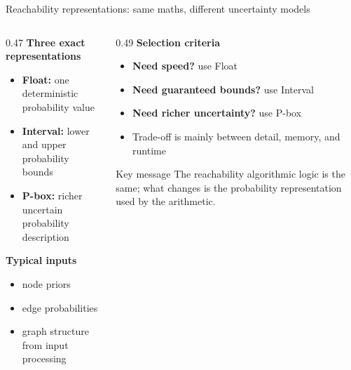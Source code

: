 \documentclass[aspectratio=169]{beamer}
\newcommand{\tightlist}{\setlength{\itemsep}{4pt}\setlength{\parskip}{2pt}}
\begin{document}
\begin{frame}{Reachability representations: same maths, different uncertainty models}
\begin{columns}[t]
\begin{column}{0.47\textwidth}
\textbf{Three exact representations}
\begin{itemize}
\tightlist
\item \textbf{Float:} one deterministic probability value
\item \textbf{Interval:} lower and upper probability bounds
\item \textbf{P-box:} richer uncertain probability description
\end{itemize}

\vspace{0.2cm}
\textbf{Typical inputs}
\begin{itemize}
\tightlist
\item node priors
\item edge probabilities
\item graph structure from input processing
\end{itemize}
\end{column}

\begin{column}{0.49\textwidth}
\textbf{Selection criteria}
\begin{itemize}
\tightlist
\item \textbf{Need speed?} use Float
\item \textbf{Need guaranteed bounds?} use Interval
\item \textbf{Need richer uncertainty?} use P-box
\item Trade-off is mainly between detail, memory, and runtime
\end{itemize}

\vspace{0.25cm}
\begin{block}{Key message}
\small
The reachability algorithmic logic is the same; what changes is the probability representation used by the arithmetic.
\end{block}
\end{column}
\end{columns}
\end{frame}
\end{document}
